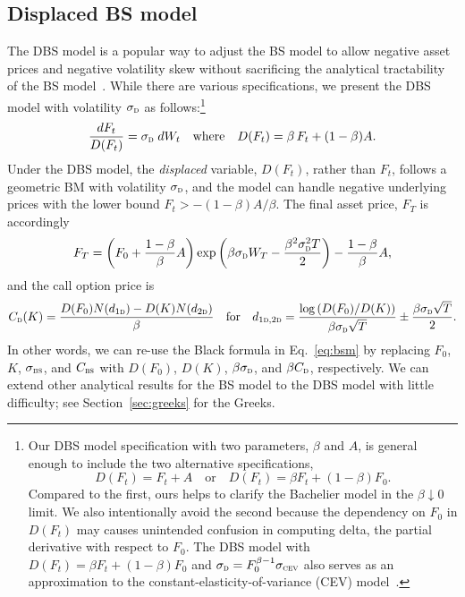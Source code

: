 \documentclass[a4paper,review]{elsarticle}
\newcommand{\qtext}[2][\quad]{#1\text{#2}#1}
\newcommand{\sigmad}{\sigma_\textsc{d}}
\newcommand{\sigmabs}{\sigma_\textsc{bs}}
\newcommand{\sigmacev}{\sigma_\textsc{cev}}
\newcommand{\bs}{\textsc{bs}}
\newcommand{\disp}{\textsc{d}}
\begin{document}
\subsection{Displaced BS model} \noindent
The DBS model is a popular way to adjust the BS model to allow negative asset prices and negative volatility skew without sacrificing the analytical tractability of the BS model~\citep{rubinstein1983displaced,joshi2003lmmsv}. While there are various specifications, we present the DBS model with volatility $\sigmad$ as follows:\footnote{Our DBS model specification with two parameters, $\beta$ and $A$, is general enough to include the two alternative specifications,
	$$ D(F_t) = F_t + A \qtext{or} D(F_t) = \beta F_t + (1-\beta) F_0. $$
	Compared to the first, ours helps to clarify the Bachelier model in the $\beta\downarrow 0$ limit. We also intentionally avoid the second because the dependency on $F_0$ in $D(F_t)$ may causes unintended confusion in computing delta, the partial derivative with respect to $F_0$. The DBS model with $D(F_t) = \beta F_t + (1-\beta)F_0$ and $\sigmad= F_0^{\beta-1}\sigmacev$ also serves as an approximation to the constant-elasticity-of-variance (CEV) model~\citep{svoboda2009disp}.}
\begin{equation} \label{eq:D}
\frac{dF_t}{D(F_t)} = \sigmad\; dW_t \qtext{where} D(F_t) = \beta\,F_t + (1-\beta)A.
\end{equation}
Under the DBS model, the \textit{displaced} variable, $D(F_t)$, rather than $F_t$, follows a geometric BM with volatility $\sigmad$, and the model can handle negative underlying prices with the lower bound $F_t>-(1-\beta)A/\beta$. The final asset price, $F_T$ is accordingly 
$$ F_T = \left(F_0+\frac{1-\beta}{\beta}A\right) \exp\left(\beta\sigmad W_T-\frac{\beta^2\sigmad^2T}{2}\right) - \frac{1-\beta}{\beta} A,
$$
and the call option price is
\begin{equation} \label{eq:dbs0}
	C_\disp(K)= \frac{D(F_0) N(d_{1\disp}) - D(K) N(d_{2\disp})}{\beta}
	\qtext{for}
	d_{1\disp,2\disp} = \frac{\log\left(D(F_0)/D(K)\right)}{\beta\sigmad\sqrt{T}} \pm \frac{\beta\sigmad\sqrt{T}}{2}.
\end{equation}
In other words, we can re-use the Black formula in Eq.~\eqref{eq:bsm} by replacing $F_0$, $K$, $\sigmabs$, and $C_\bs$ with $D(F_0)$, $D(K)$, $\beta\sigmad$, and $\beta C_\disp$, respectively. We can extend other analytical results for the BS model to the DBS model with little difficulty; see Section~\ref{sec:greeks} for the Greeks. 
\end{document}
